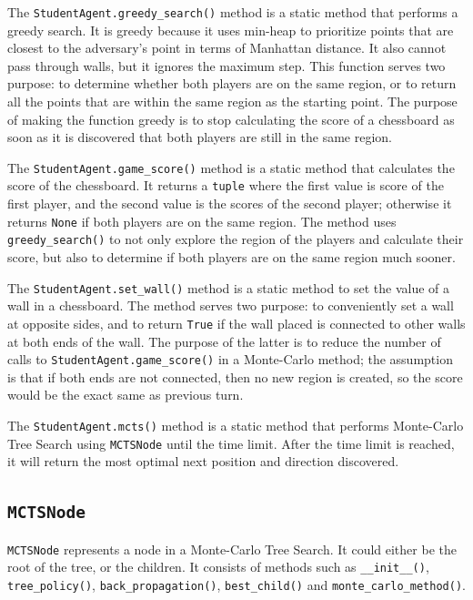 \documentclass[twoside,11pt]{article}
\begin{document}
The \texttt{StudentAgent.greedy\_search()} method is a static method that performs a greedy search.
It is greedy because it uses min-heap to prioritize points that are closest to the adversary's point in terms of Manhattan distance.
It also cannot pass through walls, but it ignores the maximum step.
This function serves two purpose: to determine whether both players are on the same region, or to return all the points that are within the same region as the starting point.
The purpose of making the function greedy is to stop calculating the score of a chessboard as soon as it is discovered that both players are still in the same region.

The \texttt{StudentAgent.game\_score()} method is a static method that calculates the score of the chessboard.
It returns a \texttt{tuple} where the first value is score of the first player, and the second value is the scores of the second player;
otherwise it returns \texttt{None} if both players are on the same region.
The method uses \texttt{greedy\_search()} to not only explore the region of the players and calculate their score, but also to determine if both players are on the same region much sooner.

The \texttt{StudentAgent.set\_wall()} method is a static method to set the value of a wall in a chessboard.
The method serves two purpose: to conveniently set a wall at opposite sides, and to return \texttt{True} if the wall placed is connected to other walls at both ends of the wall.
The purpose of the latter is to reduce the number of calls to \texttt{StudentAgent.game\_score()} in a Monte-Carlo method;
the assumption is that if both ends are not connected, then no new region is created, so the score would be the exact same as previous turn.

The \texttt{StudentAgent.mcts()} method is a static method that performs Monte-Carlo Tree Search using \texttt{MCTSNode} until the time limit.
After the time limit is reached, it will return the most optimal next position and direction discovered.

\subsection{\texttt{MCTSNode}}

\texttt{MCTSNode} represents a node in a Monte-Carlo Tree Search.
It could either be the root of the tree, or the children.
It consists of methods such as \texttt{\_\_init\_\_()}, \texttt{tree\_policy()}, \texttt{back\_propagation()}, \texttt{best\_child()} and \texttt{monte\_carlo\_method()}.
\end{document}
